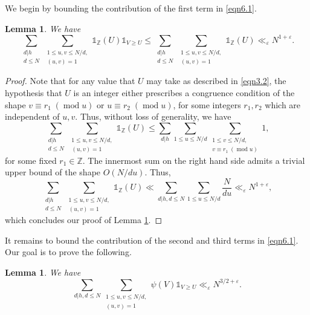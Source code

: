 \documentclass[12pt,reqno]{amsart}
\newtheorem{lemma}[theorem]{Lemma}
\theoremstyle{definition}
\theoremstyle{remark}
\numberwithin{equation}{section}
\DeclareMathOperator{\Mod}{mod}
\newcommand{\mmod}[1]{\;(\Mod{ #1})}
\renewcommand{\geq}{\geqslant}
\renewcommand{\leq}{\leqslant}
\def\eps{\varepsilon}
\newcommand\1{\mathds{1}}
\begin{document}
We begin by bounding the contribution of the first term in \eqref{eqn6.1}.

\begin{lemma} \label{lem6.1}
We have
\begin{equation*}
\sum_{\substack{d|h \\ d \leqslant N}} \sum_{\substack{1 \leq u,v \leq N/d,\\ (u,v) = 1}} \1_{\mathbb{Z}}(U)\1_{V \geq U} \leq \sum_{\substack{d|h \\ d \leqslant N}} \sum_{\substack{1 \leq u,v \leq N/d,\\ (u,v) = 1}} \1_{\mathbb{Z}}(U) \ll_{\eps} N^{1 + \eps}. 
\end{equation*}
\end{lemma}
\begin{proof}
Note that for any value that $U$ may take as described in \eqref{eqn3.2}, the hypothesis that $U$ is an integer either prescribes a congruence condition of the shape $v \equiv r_1 \mmod{u}$ or $u \equiv r_2 \mmod{u}$, for some integers $r_1, r_2$ which are independent of $u, v$. Thus, without loss of generality, we have
\[ \sum_{\substack{d|h \\ d \leqslant N}} \sum_{\substack{1 \leq u,v \leq N/d,\\ (u,v) = 1}} \1_{\mathbb{Z}}(U) \leq \sum_{d|h} \sum_{1 \leq u \leq N/d} \sum_{\substack{ 1 \leq v \leq N/d, \\ v \equiv r_1 \mmod{u}}}  1,  \]
for some fixed $r_1 \in \mathbb{Z}$. The innermost sum on the right hand side admits a trivial upper bound of the shape $O(N/du)$. Thus,
\[ \sum_{\substack{d|h \\ d \leqslant N}} \sum_{\substack{1 \leq u,v \leq N/d,\\ (u,v) = 1}} \1_{\mathbb{Z}}(U) \ll \sum_{d|h, d\leq N} \sum_{1 \leq u \leq N/d} \frac{N}{du} \ll_{\eps} N^{1 + \eps}, \]
which concludes our proof of Lemma \ref{lem6.1}.
\end{proof}



It remains to bound the contribution of the second and third terms in \eqref{eqn6.1}. Our goal is to prove the following. 

\begin{lemma} \label{lem6.2}
We have
\begin{equation*}
\sum_{d|h, d \leq N} \sum_{\substack{1 \leq u, v \leq N/d, \\ (u,v) = 1}}\psi(V) \1_{V \geq U} \ll_{\eps} N^{3/2 + \eps}. 
\end{equation*}
\end{lemma}
\end{document}
